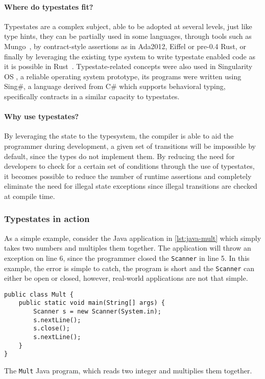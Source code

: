 \paragraph{Where do typestates fit?}
Typestates are a complex subject, able to be adopted at several levels,
just like type hints, they can be partially used in some languages,
through tools such as Mungo~\autocite{Voinea2020},
by contract-style assertions as in Ada2012, Eiffel or pre-0.4 Rust,
or finally by leveraging the existing type system to write typestate enabled code as it is possible in
Rust~\autocite{Duarte2020}.
Typestate-related concepts were also used in Singularity OS \autocite[Section 6]{Ancona2016}, a reliable operating system prototype,
its programs were written using Sing\#, a language derived from C\# which supports behavioral typing,
specifically contracts in a similar capacity to typestates.

\paragraph{Why use typestates?}
By leveraging the state to the typesystem, the compiler is able to aid the programmer during development,
a given set of transitions will be impossible by default, since the types do not implement them. %
By reducing the need for developers to check for a certain set of conditions through the use of typestates,
it becomes possible to reduce the number of runtime assertions and
completely eliminate the need for illegal state exceptions since illegal transitions are checked at compile time.


\subsubsection*{Typestates in action}

As a simple example, consider the Java application in \autoref{lst:java-mult} which simply takes two numbers and multiples them together.
The application will throw an exception on line 6,
since the programmer closed the \texttt{Scanner} in line 5.
In this example, the error is simple to catch,
the program is short and the \texttt{Scanner} can either be open or closed,
however, real-world applications are not that simple.

\begin{listing}
    \centering
    \begin{verbatim}
public class Mult {
    public static void main(String[] args) {
        Scanner s = new Scanner(System.in);
        s.nextLine();
        s.close();
        s.nextLine();
    }
}
    \end{verbatim}
    \caption{The \texttt{Mult} Java program, which reads two integer and multiplies them together.}
    \label{lst:java-mult}
\end{listing}

